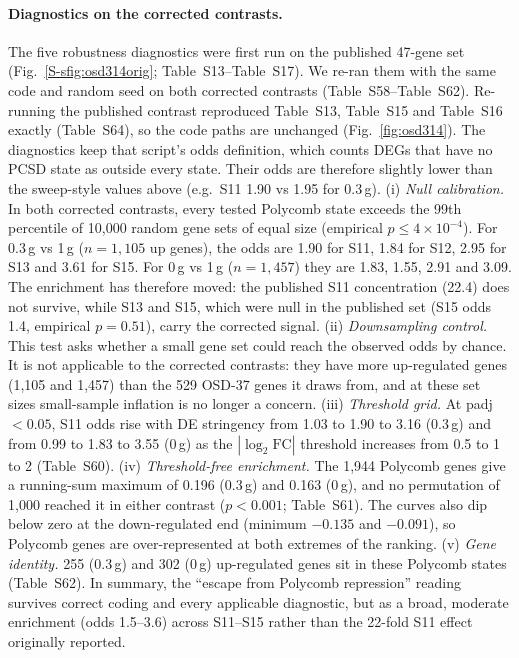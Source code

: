 \documentclass[11pt,a4paper]{article}
\newcommand{\Sx}[1]{Table~S#1}
\begin{document}
\paragraph{Diagnostics on the corrected contrasts.} The five robustness diagnostics were first run on the published
47-gene set (Fig.~\ref{S-sfig:osd314orig}; \Sx{13}--\Sx{17}). We re-ran them with the same code and random seed on both corrected
contrasts (\Sx{58}--\Sx{62}). Re-running the published contrast reproduced \Sx{13}, \Sx{15} and \Sx{16}
exactly (\Sx{64}), so the code paths are unchanged (Fig.~\ref{fig:osd314}).
The diagnostics keep that script's odds definition, which counts DEGs that have no PCSD state as outside every state.
Their odds are therefore slightly lower than the sweep-style values above (e.g.\ S11 1.90 vs 1.95 for 0.3\,g).
(i) \emph{Null calibration.} In both corrected contrasts, every tested Polycomb state exceeds the 99th percentile of
10,000 random gene sets of equal size (empirical $p\le4\times10^{-4}$). For 0.3\,g vs 1\,g ($n=1{,}105$ up genes), the odds are
1.90 for S11, 1.84 for S12, 2.95 for S13 and 3.61 for S15. For 0\,g vs 1\,g ($n=1{,}457$) they are 1.83, 1.55, 2.91 and 3.09.
The enrichment has therefore moved: the published S11 concentration (22.4) does not survive, while S13 and S15, which were null in the
published set (S15 odds 1.4, empirical $p=0.51$), carry the corrected signal.
(ii) \emph{Downsampling control.} This test asks whether a small gene set could reach the observed odds by chance. It is not
applicable to the corrected contrasts: they have more up-regulated genes (1,105 and 1,457) than the 529 OSD-37 genes it
draws from, and at these set sizes small-sample inflation is no longer a concern.
(iii) \emph{Threshold grid.} At padj $<0.05$, S11 odds rise with DE stringency from 1.03 to 1.90 to 3.16 (0.3\,g) and from
0.99 to 1.83 to 3.55 (0\,g) as the $|\log_2\mathrm{FC}|$ threshold increases from 0.5 to 1 to 2 (\Sx{60}).
(iv) \emph{Threshold-free enrichment.} The 1,944 Polycomb genes give a running-sum maximum of 0.196 (0.3\,g) and 0.163
(0\,g), and no permutation of 1,000 reached it in either contrast ($p<0.001$; \Sx{61}). The curves also dip below zero
at the down-regulated end (minimum $-0.135$ and $-0.091$), so Polycomb genes are over-represented at both
extremes of the ranking.
(v) \emph{Gene identity.} 255 (0.3\,g) and 302 (0\,g) up-regulated genes sit in these Polycomb states (\Sx{62}).
In summary, the ``escape from Polycomb repression'' reading survives correct coding and every applicable diagnostic,
but as a broad, moderate enrichment (odds 1.5--3.6) across S11--S15 rather than the 22-fold S11 effect originally
reported.
\end{document}
